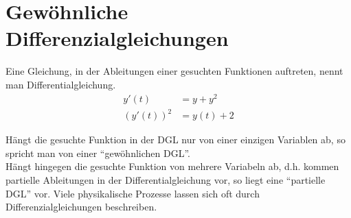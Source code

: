 \chapter{Gewöhnliche Differenzialgleichungen}
Eine Gleichung, in der Ableitungen einer gesuchten Funktionen auftreten, nennt man Differentialgleichung.
\begin{align*}
y'(t)&=y+y^2\\
\left( y'(t)\right)^2&=y(t)+2
\end{align*}

Hängt die gesuchte Funktion in der DGL nur von einer einzigen Variablen ab, so spricht man von einer ``gewöhnlichen DGL''.\\

Hängt hingegen die gesuchte Funktion von mehrere Variabeln ab, d.h. kommen partielle Ableitungen in der Differentialgleichung vor, so liegt eine ``partielle DGL'' vor. Viele physikalische Prozesse lassen sich oft durch Differenzialgleichungen beschreiben.
